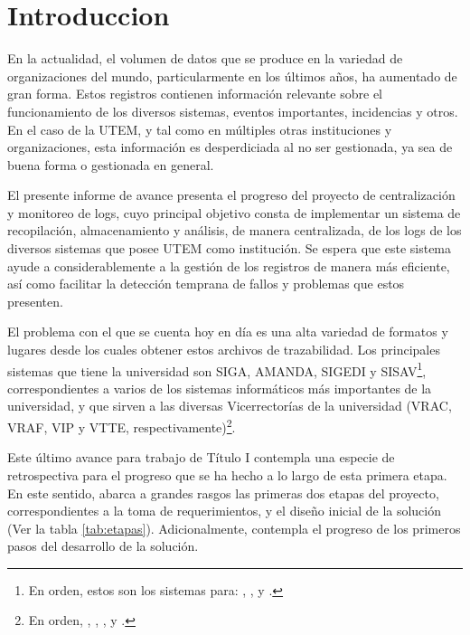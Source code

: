 \section{Introduccion}

En la actualidad, el volumen de datos que se produce en la variedad de organizaciones del mundo, particularmente en los últimos años, ha aumentado de gran forma. Estos registros contienen información relevante sobre el funcionamiento de los diversos sistemas, eventos importantes, incidencias y otros. En el caso de la UTEM, y tal como en múltiples otras instituciones y organizaciones, esta información es desperdiciada al no ser gestionada, ya sea de buena forma o gestionada en general.

El presente informe de avance presenta el progreso del proyecto de centralización y monitoreo de logs, cuyo principal objetivo consta de implementar un sistema de recopilación, almacenamiento y análisis, de manera centralizada, de los logs de los diversos sistemas que posee UTEM como institución. Se espera que este sistema ayude a considerablemente a la gestión de los registros de manera más eficiente, así como facilitar la detección temprana de fallos y problemas que estos presenten.

El problema con el que se cuenta hoy en día es una alta variedad de formatos y lugares desde los cuales obtener estos archivos de trazabilidad. Los principales sistemas que tiene la universidad son SIGA, AMANDA, SIGEDI y SISAV\footnote{En orden, estos son los sistemas para: , ,  y .}, correspondientes a varios de los sistemas informáticos más importantes de la universidad, y que sirven a las diversas Vicerrectorías de la universidad (VRAC, VRAF, VIP y VTTE, respectivamente)\footnote{En orden, , , , y .}.

Este último avance para trabajo de Título I contempla una especie de retrospectiva para el progreso que se ha hecho a lo largo de esta primera etapa. En este sentido, abarca a grandes rasgos las primeras dos etapas del proyecto, correspondientes a la toma de requerimientos, y el diseño inicial de la solución (Ver la tabla \ref{tab:etapas}). Adicionalmente, contempla el progreso de los primeros pasos del desarrollo de la solución.

